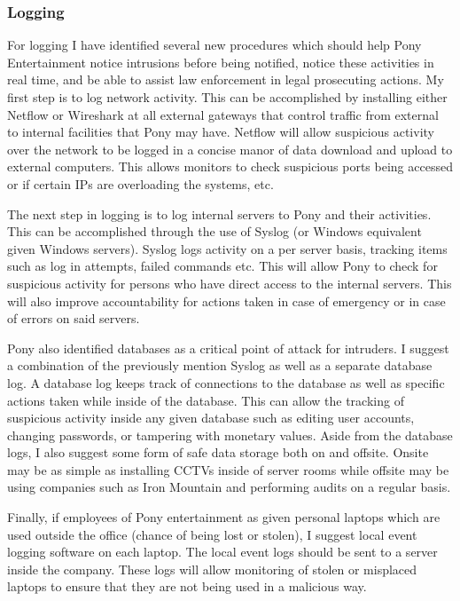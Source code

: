 \documentclass[paper=a4, fontsize=11pt]{scrartcl} %
\numberwithin{equation}{section} %
\numberwithin{figure}{section} %
\numberwithin{table}{section} %
\begin{document}

\subsubsection{Logging}
For logging I have identified several new procedures which should help Pony Entertainment
notice intrusions before being notified, notice these activities in real time, and be
able to assist law enforcement in legal prosecuting actions. My first step is to log
network activity. This can be accomplished by installing either Netflow or Wireshark
at all external gateways that control traffic from external to internal facilities
that Pony may have. Netflow will allow suspicious activity over the network to be
logged in a concise manor of data download and upload to external computers. This allows
monitors to check suspicious ports being accessed or if certain IPs are overloading the
systems, etc.

The next step in logging is to log internal servers to Pony and their activities. This
can be accomplished through the use of Syslog (or Windows equivalent given Windows 
servers). Syslog logs activity on a per server basis, tracking items such as log in 
attempts, failed commands etc. This will allow Pony to check for suspicious activity
for persons who have direct access to the internal servers. This will also improve
accountability for actions taken in case of emergency or in case of errors on said
servers. 

Pony also identified databases as a critical point of attack for intruders. I suggest
a combination of the previously mention Syslog as well as a separate database log. A 
database log keeps track of connections to the database as well as specific actions
taken while inside of the database. This can allow the tracking of suspicious activity
inside any given database such as editing user accounts, changing passwords, or tampering
with monetary values. Aside from the database logs, I also suggest some form of safe data 
storage both on and offsite. Onsite may be as simple as installing CCTVs inside of server
rooms while offsite may be using companies such as Iron Mountain and performing audits
on a regular basis.

Finally, if employees of Pony entertainment as given personal laptops which are used
outside the office (chance of being lost or stolen), I suggest local event logging
software on each laptop. The local event logs should be sent to a server inside the
company. These logs will allow monitoring of stolen or misplaced laptops to ensure
that they are not being used in a malicious way. 
\end{document}
